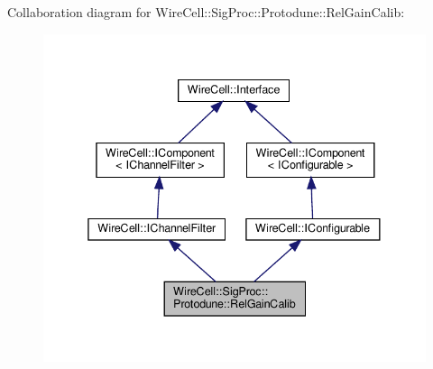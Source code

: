 Collaboration diagram for Wire\+Cell\+:\+:Sig\+Proc\+:\+:Protodune\+:\+:Rel\+Gain\+Calib\+:
\nopagebreak
\begin{figure}[H]
\begin{center}
\leavevmode
\includegraphics[width=338pt]{class_wire_cell_1_1_sig_proc_1_1_protodune_1_1_rel_gain_calib__coll__graph}
\end{center}
\end{figure}
